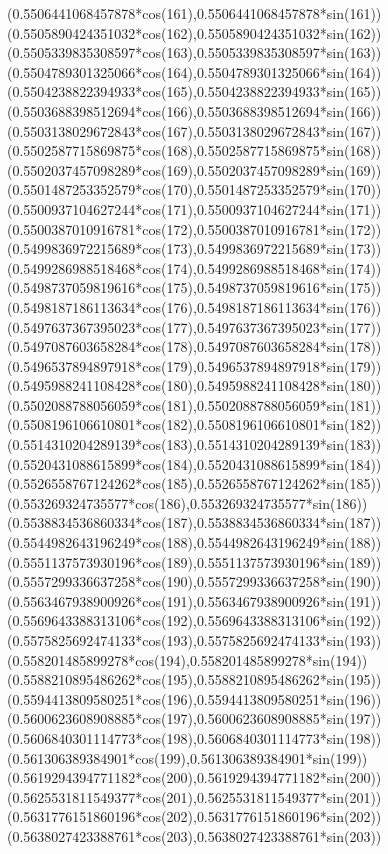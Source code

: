 {({0.5506441068457878*cos(161)},{0.5506441068457878*sin(161)})
({0.5505890424351032*cos(162)},{0.5505890424351032*sin(162)})
({0.5505339835308597*cos(163)},{0.5505339835308597*sin(163)})
({0.5504789301325066*cos(164)},{0.5504789301325066*sin(164)})
({0.5504238822394933*cos(165)},{0.5504238822394933*sin(165)})
({0.5503688398512694*cos(166)},{0.5503688398512694*sin(166)})
({0.5503138029672843*cos(167)},{0.5503138029672843*sin(167)})
({0.5502587715869875*cos(168)},{0.5502587715869875*sin(168)})
({0.5502037457098289*cos(169)},{0.5502037457098289*sin(169)})
({0.5501487253352579*cos(170)},{0.5501487253352579*sin(170)})
({0.5500937104627244*cos(171)},{0.5500937104627244*sin(171)})
({0.5500387010916781*cos(172)},{0.5500387010916781*sin(172)})
({0.5499836972215689*cos(173)},{0.5499836972215689*sin(173)})
({0.5499286988518468*cos(174)},{0.5499286988518468*sin(174)})
({0.5498737059819616*cos(175)},{0.5498737059819616*sin(175)})
({0.5498187186113634*cos(176)},{0.5498187186113634*sin(176)})
({0.5497637367395023*cos(177)},{0.5497637367395023*sin(177)})
({0.5497087603658284*cos(178)},{0.5497087603658284*sin(178)})
({0.5496537894897918*cos(179)},{0.5496537894897918*sin(179)})
({0.5495988241108428*cos(180)},{0.5495988241108428*sin(180)})
({0.5502088788056059*cos(181)},{0.5502088788056059*sin(181)})
({0.5508196106610801*cos(182)},{0.5508196106610801*sin(182)})
({0.5514310204289139*cos(183)},{0.5514310204289139*sin(183)})
({0.5520431088615899*cos(184)},{0.5520431088615899*sin(184)})
({0.5526558767124262*cos(185)},{0.5526558767124262*sin(185)})
({0.553269324735577*cos(186)},{0.553269324735577*sin(186)})
({0.5538834536860334*cos(187)},{0.5538834536860334*sin(187)})
({0.5544982643196249*cos(188)},{0.5544982643196249*sin(188)})
({0.5551137573930196*cos(189)},{0.5551137573930196*sin(189)})
({0.5557299336637258*cos(190)},{0.5557299336637258*sin(190)})
({0.5563467938900926*cos(191)},{0.5563467938900926*sin(191)})
({0.5569643388313106*cos(192)},{0.5569643388313106*sin(192)})
({0.5575825692474133*cos(193)},{0.5575825692474133*sin(193)})
({0.558201485899278*cos(194)},{0.558201485899278*sin(194)})
({0.5588210895486262*cos(195)},{0.5588210895486262*sin(195)})
({0.5594413809580251*cos(196)},{0.5594413809580251*sin(196)})
({0.5600623608908885*cos(197)},{0.5600623608908885*sin(197)})
({0.5606840301114773*cos(198)},{0.5606840301114773*sin(198)})
({0.561306389384901*cos(199)},{0.561306389384901*sin(199)})
({0.5619294394771182*cos(200)},{0.5619294394771182*sin(200)})
({0.5625531811549377*cos(201)},{0.5625531811549377*sin(201)})
({0.5631776151860196*cos(202)},{0.5631776151860196*sin(202)})
({0.5638027423388761*cos(203)},{0.5638027423388761*sin(203)})
}

